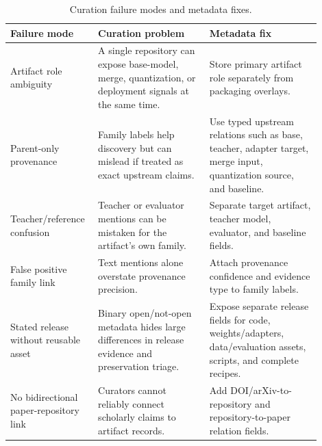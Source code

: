 \begin{table}[t]
\centering
\caption{Curation failure modes and metadata fixes.}
\label{tab:failure-examples}
\small
\begin{tabular}{p{0.22\linewidth}p{0.34\linewidth}p{0.34\linewidth}}
\toprule
Failure mode & Curation problem & Metadata fix \\
\midrule
Artifact role ambiguity & A single repository can expose base-model, merge, quantization, or deployment signals at the same time. & Store primary artifact role separately from packaging overlays. \\
Parent-only provenance & Family labels help discovery but can mislead if treated as exact upstream claims. & Use typed upstream relations such as base, teacher, adapter target, merge input, quantization source, and baseline. \\
Teacher/reference confusion & Teacher or evaluator mentions can be mistaken for the artifact's own family. & Separate target artifact, teacher model, evaluator, and baseline fields. \\
False positive family link & Text mentions alone overstate provenance precision. & Attach provenance confidence and evidence type to family labels. \\
Stated release without reusable asset & Binary open/not-open metadata hides large differences in release evidence and preservation triage. & Expose separate release fields for code, weights/adapters, data/evaluation assets, scripts, and complete recipes. \\
No bidirectional paper-repository link & Curators cannot reliably connect scholarly claims to artifact records. & Add DOI/arXiv-to-repository and repository-to-paper relation fields. \\
\bottomrule
\end{tabular}
\end{table}
